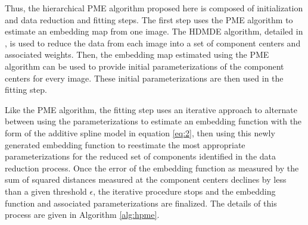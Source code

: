 \documentclass[11pt,reqno]{article}
\theoremstyle{definition}
\begin{document}
Thus, the hierarchical PME algorithm proposed here is composed of initialization and data reduction and fitting steps. The first step uses the PME algorithm to estimate an embedding map from one image. The HDMDE algorithm, detailed in \cite{mengPrincipalManifoldEstimation2021}, is used to reduce the data from each image into a set of component centers and associated weights. Then, the embedding map estimated using the PME algorithm can be used to provide initial parameterizations of the component centers for every image. These initial parameterizations are then used in the fitting step. 

Like the PME algorithm, the fitting step uses an iterative approach to alternate between using the parameterizations to estimate an embedding function with the form of the additive spline model in equation \ref{eq:2}, then using this newly generated embedding function to reestimate the most appropriate parameterizations for the reduced set of components identified in the data reduction process. Once the error of the embedding function as measured by the sum of squared distances measured at the component centers declines by less than a given threshold $\epsilon$, the iterative procedure stops and the embedding function and associated parameterizations are finalized. The details of this process are given in Algorithm \ref{alg:hpme}.
\end{document}
